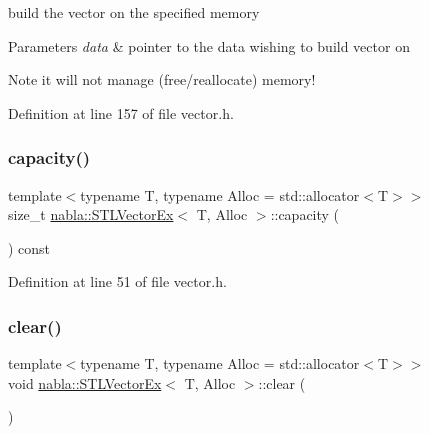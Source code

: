 build the vector on the specified memory 
\begin{DoxyParams}{Parameters}
{\em data} & pointer to the data wishing to build vector on \\
\hline
\end{DoxyParams}
\begin{DoxyNote}{Note}
it will not manage (free/reallocate) memory! 
\end{DoxyNote}


Definition at line 157 of file vector.\+h.

\mbox{\label{classnabla_1_1_s_t_l_vector_ex_a44ff1b69309686b9b3f1ea125982b078}} 
\subsubsection{\texorpdfstring{capacity()}{capacity()}}
{\footnotesize\ttfamily template$<$typename T, typename Alloc = std\+::allocator$<$\+T$>$$>$ \\
size\+\_\+t \mbox{\hyperlink{classnabla_1_1_s_t_l_vector_ex}{nabla\+::\+S\+T\+L\+Vector\+Ex}}$<$ T, Alloc $>$\+::capacity (\begin{DoxyParamCaption}{ }\end{DoxyParamCaption}) const\hspace{0.3cm}{\ttfamily [inline]}}



Definition at line 51 of file vector.\+h.

\mbox{\label{classnabla_1_1_s_t_l_vector_ex_a262bd3464db2aff36aa6bb90dbf5e7ec}} 
\subsubsection{\texorpdfstring{clear()}{clear()}}
{\footnotesize\ttfamily template$<$typename T, typename Alloc = std\+::allocator$<$\+T$>$$>$ \\
void \mbox{\hyperlink{classnabla_1_1_s_t_l_vector_ex}{nabla\+::\+S\+T\+L\+Vector\+Ex}}$<$ T, Alloc $>$\+::clear (\begin{DoxyParamCaption}{ }\end{DoxyParamCaption})\hspace{0.3cm}{\ttfamily [inline]}}



